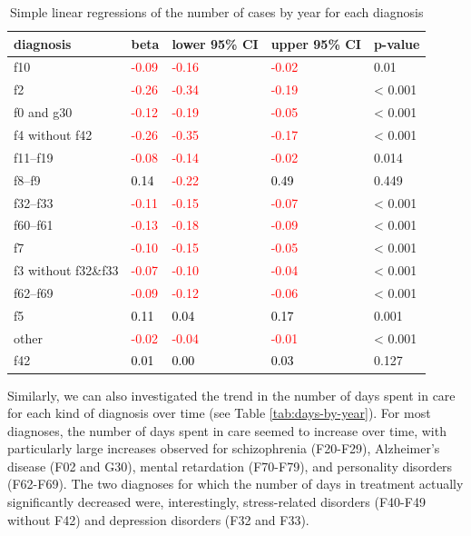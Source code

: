 \documentclass[
  openany]{book}
\theoremstyle{definition}
\theoremstyle{definition}
\theoremstyle{definition}
\theoremstyle{definition}
\theoremstyle{remark}
\begin{document}
\begin{table}
\centering
\caption{\label{tab:cases-by-year}Simple linear regressions of the number of cases by year for each diagnosis}
\centering
\begin{tabular}[t]{l>{}l>{}l>{}ll}
\toprule
diagnosis & beta & lower 95\% CI & upper 95\% CI & p-value\\
\midrule
f10 & \textcolor{red}{-0.09} & \textcolor{red}{-0.16} & \textcolor{red}{-0.02} & 0.01\\
f2 & \textcolor{red}{-0.26} & \textcolor{red}{-0.34} & \textcolor{red}{-0.19} & < 0.001\\
f0 and g30 & \textcolor{red}{-0.12} & \textcolor{red}{-0.19} & \textcolor{red}{-0.05} & < 0.001\\
f4 without f42 & \textcolor{red}{-0.26} & \textcolor{red}{-0.35} & \textcolor{red}{-0.17} & < 0.001\\
f11–f19 & \textcolor{red}{-0.08} & \textcolor{red}{-0.14} & \textcolor{red}{-0.02} & 0.014\\
\addlinespace
f8–f9 & \textcolor{black}{0.14} & \textcolor{red}{-0.22} & \textcolor{black}{0.49} & 0.449\\
f32–f33 & \textcolor{red}{-0.11} & \textcolor{red}{-0.15} & \textcolor{red}{-0.07} & < 0.001\\
f60–f61 & \textcolor{red}{-0.13} & \textcolor{red}{-0.18} & \textcolor{red}{-0.09} & < 0.001\\
f7 & \textcolor{red}{-0.10} & \textcolor{red}{-0.15} & \textcolor{red}{-0.05} & < 0.001\\
f3 without f32\&f33 & \textcolor{red}{-0.07} & \textcolor{red}{-0.10} & \textcolor{red}{-0.04} & < 0.001\\
\addlinespace
f62–f69 & \textcolor{red}{-0.09} & \textcolor{red}{-0.12} & \textcolor{red}{-0.06} & < 0.001\\
f5 & \textcolor{black}{0.11} & \textcolor{black}{0.04} & \textcolor{black}{0.17} & 0.001\\
other & \textcolor{red}{-0.02} & \textcolor{red}{-0.04} & \textcolor{red}{-0.01} & < 0.001\\
f42 & \textcolor{black}{0.01} & \textcolor{black}{0.00} & \textcolor{black}{0.03} & 0.127\\
\bottomrule
\end{tabular}
\end{table}

Similarly, we can also investigated the trend in the number of days spent in care for each kind of diagnosis over time (see Table \ref{tab:days-by-year}). For most diagnoses, the number of days spent in care seemed to increase over time, with particularly large increases observed for schizophrenia (F20-F29), Alzheimer's disease (F02 and G30), mental retardation (F70-F79), and personality disorders (F62-F69). The two diagnoses for which the number of days in treatment actually significantly decreased were, interestingly, stress-related disorders (F40-F49 without F42) and depression disorders (F32 and F33).
\end{document}
